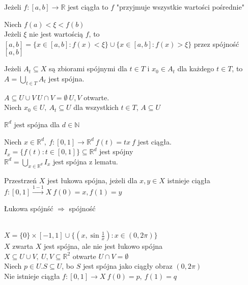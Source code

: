\begin{wn} 
    Jeżeli $f: [a,b] \to \mathbb{R}$ jest ciągła to $f$ "przyjmuje wszystkie wartości 
    pośrednie"
\end{wn} 
\begin{dd} 
    Niech $f(a) < \xi < f(b)$ \\ 
    Jeżeli $\xi$ nie jest wartością $f$, to $[a,b] = \{x \in [a,b]: f(x) < \xi \} \cup 
    \{ x \in [a,b]: f(x) > \xi \}$ przez spójność $[a,b]$
\end{dd} 
\begin{lem} 
    Jeżeli $A_t \subseteq X$ są zbiorami spójnymi dla $t \in T$ i $x_0 \in A_t$ dla 
    każdego $t \in T$, to $A = \bigcup\limits_{t \in T} A_t$ jest spójna. 
    \begin{dd} 
        $A \subseteq U \cup V \ U \cap V = \emptyset \ U,V$ otwarte. \\ 
        Niech $x_0 \in U,\ A_t \subseteq U$ dla wszystkich $t \in T$, $A \subseteq U$
    \end{dd} 
\end{lem} 
\begin{tw} 
    $\mathbb{R}^d$ jest spójna dla $d \in \mathbb{N}$
\end{tw} 
\begin{dd} 
    Niech $x \in \mathbb{R}^d,\ f:[0,1] \to \mathbb R^d \ f(t) = tx \ f$ jest ciągła. 
    $I_x = \{f(t): t \in [0,1]\} \subseteq \mathbb R^d$ jest spójny \\ 
    $\mathbb{R}^d = \bigcup\limits_{x \in \mathbb R^d} I_x$ jest spójna z lematu. 
\end{dd} 
\begin{df} 
    Przestrzeń $X$ jest łukowa spójna, jeżeli dla $x,y \in X$ istnieje ciągła 
    $f: [0,1] \xrightarrow{1-1} X \ f(0) = x, f(1) = y$
\end{df} 
\begin{uw} 
    Łukowa spójnść $\Rightarrow$ spójność
\end{uw} 
\begin{prz} ~\\ 
    $X = \{0\} \times [-1,1] \cup \{ (x,\sin \frac{1}{x}): x \in (0,2\pi) \} $ \\ 
    $X$ zwarta
    $X$ jest spójna, ale nie jest łukowo spójna \\ 
    $X \subseteq U \cup V, \ U, V \subseteq \mathbb{R}^2$ otwarte $U \cap V = \emptyset$\\
    Niech $p \in U. S \subseteq U$, bo $S$ jest spójna jako ciągły obraz $(0,2\pi)$ \\ 
    Nie istnieje ciągła $f:[0,1] \to X \ f(0) = p,\ f(1) = q$
\end{prz} 
